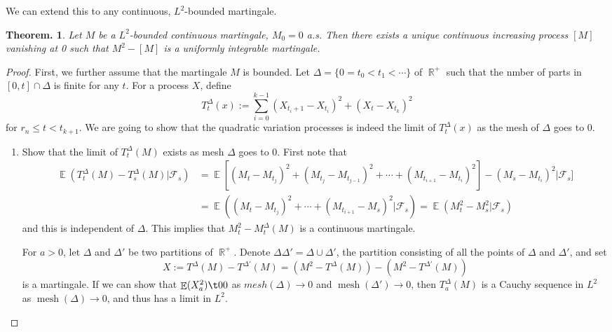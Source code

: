 \documentclass[11pt, a4paper]{memoir}
\DeclareMathOperator{\R}{{\mathbb{R}}}
\theoremstyle{change}
\newtheorem{theorem}{Theorem.}[section]
\theoremstyle{plain}
\theoremstyle{nonumberplain}
\newtheorem{proof}{Proof}
\DeclareMathOperator{\E}{{\mathbb{E}}}
\DeclareMathOperator{\mesh}{mesh}
\numberwithin{equation}{section}
\begin{document}
We can extend this to any continuous, $L^2$-bounded martingale.
\begin{theorem}
    Let $M$ be a $L^2$-bounded continuous martingale, $M_0=0$ a.s.
    Then there exists a unique continuous increasing process $[M]$ vanishing at 0 such that $M^2-[M]$ is a uniformly integrable martingale.
\end{theorem}
\begin{proof}
    First, we further assume that the martingale $M$ is bounded.
    Let $\Delta=\{0=t_0<t_1<\cdots\}$ of $\R^+$ such that the nmber of parts in $[0,t]\cap\Delta$ is finite for any $t$.
    For a process $X$, define
    \begin{equation*}
        T_t^\Delta(x) := \sum_{i=0}^{k-1}(X_{t_i+1}-X_{t_i})^2+(X_t-X_{t_k})^2
    \end{equation*}
    for $r_n\leq t<t_{k+1}$.
    We are going to show that the quadratic variation processes is indeed the limit of $T_t^\Delta(x)$ as the mesh of $\Delta$ goes to $0$.
    \begin{enumerate}[nl]
        \item Show that the limit of $T_t^\Delta(M)$ exists as mesh $\Delta$ goes to 0.
            First note that
            \begin{align}\label{e:cmart}
                \E(T_t^\Delta(M)-T_s^\Delta(M)|\mathcal{F}_s) &= \E[(M_t-M_{t_j})^2+(M_{t_j}-M_{t_{j-1}})^2+\cdots+(M_{t_{i+1}}-M_{t_i})^2]-(M_s-M_{t_i})^2|\mathcal{F}_s]\\
                                                              &=\E((M_t-M_{t_j})^2+\cdots+(M_{t_{i+1}}-M_s)^2|\mathcal{F}_s)=\E(M_t^2-M_s^2|\mathcal{F}_s)
            \end{align}
            and this is independent of $\Delta$.
            This implies that $M_t^2-M_t^\Delta(M)$ is a continuous martingale.

            For $a>0$, let $\Delta$ and $\Delta'$ be two partitions of $\R^+$.
            Denote $\Delta\Delta'=\Delta\cup\Delta'$, the partition consisting of all the points of $\Delta$ and $\Delta'$, and set
            \begin{equation*}
                X := T^\Delta(M)-T^{\Delta'}(M)=(M^2-T^\Delta(M))-(M^2-T^{\Delta'}(M))
            \end{equation*}
            is a martingale.
            If we can show that $\E(X_a^2)\t0 0$ as $mesh(\Delta)\to 0$ and $\mesh(\Delta')\to 0$, then $T_a^\Delta(M)$ is a Cauchy sequence in $L^2$ as $\mesh(\Delta)\to 0$, and thus has a limit in $L^2$.


\end{enumerate}
\end{proof}
\end{document}
